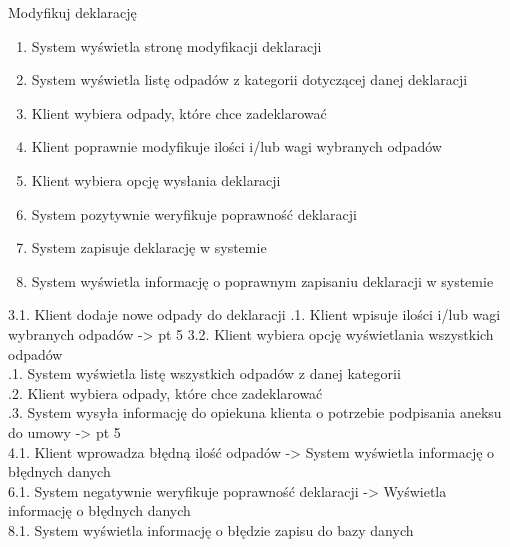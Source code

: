 	\begin{usecase}{Modyfikuj deklarację}
		\author{Beata Obrok}
		\maketitle
		\begin{scenario}
			\begin{enumerate}
				\item System wyświetla stronę modyfikacji deklaracji
				\item System wyświetla listę odpadów z kategorii dotyczącej danej deklaracji
				\item Klient wybiera odpady, które chce zadeklarować
				\item Klient poprawnie modyfikuje ilości i/lub wagi wybranych odpadów
				\item Klient wybiera opcję wysłania deklaracji
				\item System pozytywnie weryfikuje poprawność deklaracji
				\item System zapisuje deklarację w systemie
				\item System wyświetla informację o poprawnym zapisaniu deklaracji w systemie
			\end{enumerate}
		\end{scenario}
				3.1. Klient dodaje nowe odpady do deklaracji
					.1. Klient wpisuje ilości i/lub wagi wybranych odpadów -> pt 5
				3.2. Klient wybiera opcję wyświetlania wszystkich odpadów \\
					.1. System wyświetla listę wszystkich odpadów z danej kategorii \\
					.2. Klient wybiera odpady, które chce zadeklarować \\
					.3. System wysyła informację do opiekuna klienta o potrzebie podpisania aneksu do umowy -> pt 5 \\
				4.1. Klient wprowadza błędną ilość odpadów -> System wyświetla informację o błędnych danych \\
				6.1. System negatywnie weryfikuje poprawność deklaracji -> Wyświetla informację o błędnych danych \\
				8.1. System wyświetla informację o błędzie zapisu do bazy danych \\
	\end{usecase}

